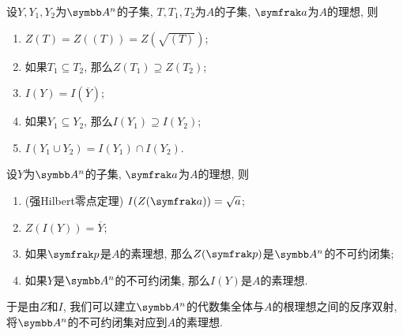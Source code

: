 \begin{propositionnoproof}\label{prop:affinegaloisconnectionclosedradicalpre}
  设$Y, Y_1, Y_2$为$\AF^n$的子集, $T, T_1, T_2$为$A$的子集, $\ideal{a}$为$A$的理想, 则
  \begin{enumerate}
    \item\label{enum:prop-affine-galois-connection-closed-radical-1} $Z(T)=Z((T))=Z(\sqrt{(T)})$;
    \item\label{enum:prop-affine-galois-connection-closed-radical-2} 如果$T_1\subseteq T_2$, 那么$Z(T_1)\supseteq Z(T_2)$;
    \item\label{enum:prop-affine-galois-connection-closed-radical-3} $I(Y)=I(\overline{Y})$;
    \item\label{enum:prop-affine-galois-connection-closed-radical-4} 如果$Y_1\subseteq Y_2$, 那么$I(Y_1)\supseteq I(Y_2)$;
    \item\label{enum:prop-affine-galois-connection-closed-radical-5} $I(Y_1\cup Y_2)=I(Y_1)\cap I(Y_2)$.
  \end{enumerate}
\end{propositionnoproof}

\begin{proposition}\label{prop:affinegaloisconnectionclosedradical}
  设$Y$为$\AF^n$的子集, $\ideal{a}$为$A$的理想, 则
  \begin{enumerate}
    \item\label{enum:prop-affine-galois-connection-closed-radical-nullstellensatz} (强Hilbert零点定理\parencite[85, Exercise 14]{atiyah_introduction_1969}) $I(Z(\ideal{a}))=\sqrt{a}$;
    \item\label{enum:prop-affine-galois-connection-closed-radical-closure} $Z(I(Y))=\overline{Y}$;
    \item\label{enum:prop-affine-galois-connection-closed-radical-8} 如果$\ideal{p}$是$A$的素理想, 那么$Z(\ideal{p})$是$\AF^n$的不可约闭集;
    \item\label{enum:prop-affine-galois-connection-closed-radical-9} 如果$Y$是$\AF^n$的不可约闭集, 那么$I(Y)$是$A$的素理想.
  \end{enumerate}
  于是由$Z$和$I$, 我们可以建立$\AF^n$的代数集全体与$A$的根理想之间的反序双射, 将$\AF^n$的不可约闭集对应到$A$的素理想.
\end{proposition}

